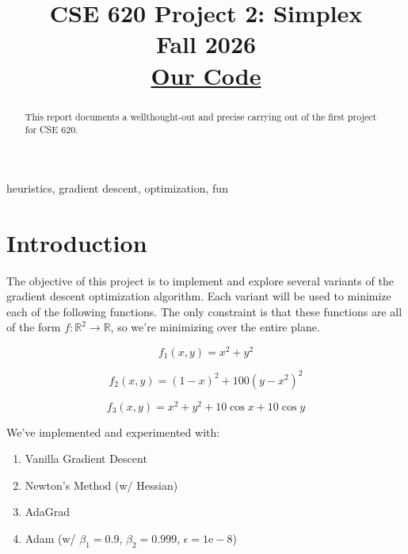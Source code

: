 \documentclass[conference]{IEEEtran}
\begin{document}
\title{
    CSE 620 Project 2: Simplex \\[0.5em]
    \Large Fall 2026\\[0.5em]
    \large \href{https://github.com/jkellogg123/CSE_620_Fall26_Project2_Robert_John/tree/main}{Our Code}
}

\author{
    \and
}

\maketitle

\begin{abstract}
This report documents a wellthought-out and precise carrying out of the first project for CSE 620.
\end{abstract}

\begin{IEEEkeywords}
heuristics, gradient descent, optimization, fun
\end{IEEEkeywords}

\section{Introduction}
The objective of this project is to implement and explore several variants of the gradient descent optimization algorithm.
Each variant will be used to minimize each of the following functions. The only
constraint is that these functions are all of the form $f: \mathbb{R}^2 \to \mathbb{R}$,
so we're minimizing over the entire plane.

\begin{equation}
    f_1(x,y) = x^2 + y^2
\end{equation}

\begin{equation}
    f_2(x,y) = (1-x)^2 + 100(y - x^2)^2
\end{equation}

\begin{equation}
    f_3(x,y) = x^2 + y^2 + 10\cos{x} + 10\cos{y}
\end{equation}

We've implemented and experimented with:

\begin{enumerate}
    \item Vanilla Gradient Descent
    \item Newton's Method (w/ Hessian)
    \item AdaGrad
    \item Adam (w/ $\beta_1=0.9$, $\beta_2=0.999$, $\epsilon=1\mathrm{e}-8$)
\end{enumerate}
\end{document}
